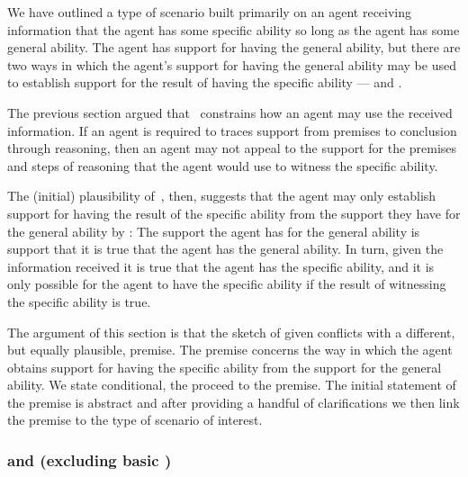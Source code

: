 \hozline{}

\begin{note}
  We have outlined a type of scenario built primarily on an agent receiving information that the agent has some specific ability so long as the agent has some general ability.
  The agent has support for having the general ability, but there are two ways in which the agent's support for having the general ability may be used to establish support for {\color{red} the result of having the specific ability} --- \AR{} and \WR{}.

  The previous section argued that~\ESU{} constrains how an agent may use the received information.
  If an agent is required to traces support from premises to conclusion through reasoning, then an agent may not appeal to the support for the premises and steps of reasoning that the agent would use to witness the specific ability.
  
  The (initial) plausibility of~\ESU{}, then, suggests that the agent may only establish support for having the {\color{red} result of the specific ability} from the support they have for the general ability by \AR{}:
  The support the agent has for the general ability is support that it is true that the agent has the general ability.
  In turn, given the information received it is true that the agent has the specific ability, and it is only possible for the agent to have the specific ability if the result of witnessing the specific ability is true.

  The argument of this section is that the sketch of \AR{} given conflicts with a different, but equally plausible, premise.
  The premise concerns the way in which the agent obtains support for having the specific ability from the support for the general ability.
  We state conditional, the proceed to the premise.
  The initial statement of the premise is abstract and after providing a handful of clarifications we then link the premise to the type of scenario of interest.
\end{note}

\subsubsection{\nI{} and \ur{} (excluding basic \AR{})}
\label{sec:ur}

